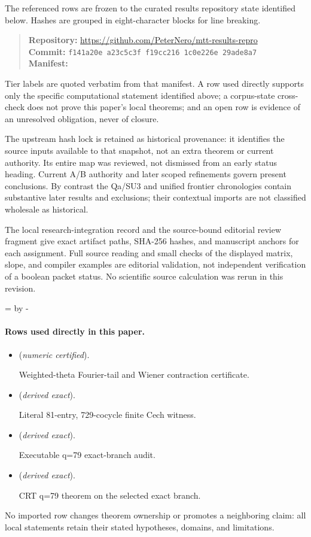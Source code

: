 \documentclass[11pt]{article}
\theoremstyle{definition}
\theoremstyle{remark}
\begin{document}
The referenced rows are frozen to the curated results repository state identified below. Hashes are grouped in eight-character blocks for line breaking.
\begin{quote}\small
\textbf{Repository:} \url{https://github.com/PeterNero/mtt-results-repro}\\
\textbf{Commit:} \texttt{f141a20e a23c5c3f f19cc216 1c0e226e 29ade8a7}\\
\textbf{Manifest:} 
\end{quote}

Tier labels are quoted verbatim from that manifest. A row used directly supports only the specific computational statement identified above; a corpus-state cross-check does not prove this paper's local theorems; and an open row is evidence of an unresolved obligation, never of closure.

The upstream hash lock \cite{FRLock} is retained as historical provenance:
it identifies the source inputs available to that snapshot, not an extra
theorem or current authority.  Its entire map was reviewed, not dismissed
from an early status heading.  Current A/B authority and later scoped
refinements govern present conclusions.  By contrast the Qa/SU3 and unified
frontier chronologies contain substantive later results and exclusions;
their contextual imports are not classified wholesale as historical.

The local research-integration record and the source-bound editorial review
fragment give exact artifact paths, SHA-256 hashes, and manuscript anchors
for each assignment.  Full source reading and small checks of the displayed
matrix, slope, and compiler examples are editorial validation, not
independent verification of a boolean packet status.  No scientific source
calculation was rerun in this revision.

\par\begingroup{}=\pagegoal\advance{} by -\pagetotal\ifdim\dimen0<7\baselineskip\newpage\fi\endgroup
\paragraph{Rows used directly in this paper.}
\begin{itemize}
\setlength{\itemsep}{0.25em}
\item {} (\emph{numeric certified}).\par Weighted-theta Fourier-tail and Wiener contraction certificate.
\item {} (\emph{derived exact}).\par Literal 81-entry, 729-cocycle finite Cech witness.
\item {} (\emph{derived exact}).\par Executable q=79 exact-branch audit.
\item {} (\emph{derived exact}).\par CRT q=79 theorem on the selected exact branch.
\end{itemize}

No imported row changes theorem ownership or promotes a neighboring claim: all local statements retain their stated hypotheses, domains, and limitations.


\end{document}
